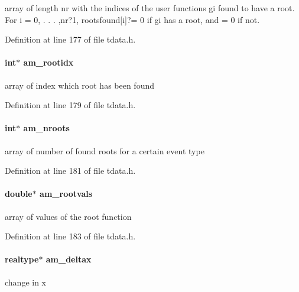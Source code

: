 array of length nr with the indices of the user functions gi found to have a root. For i = 0, . . . ,nr?1, rootsfound\mbox{[}i\mbox{]}?= 0 if gi has a root, and = 0 if not. 

Definition at line 177 of file tdata.\+h.

\hypertarget{struct_temp_data_a360ea220e712750c92bd3fc8b56230e2}{}
\paragraph[{am\+\_\+rootidx}]{\setlength{\rightskip}{0pt plus 5cm}int$\ast$ am\+\_\+rootidx}\label{struct_temp_data_a360ea220e712750c92bd3fc8b56230e2}
array of index which root has been found 

Definition at line 179 of file tdata.\+h.

\hypertarget{struct_temp_data_af329293bdb28f52dcaeb04355dc5c69e}{}
\paragraph[{am\+\_\+nroots}]{\setlength{\rightskip}{0pt plus 5cm}int$\ast$ am\+\_\+nroots}\label{struct_temp_data_af329293bdb28f52dcaeb04355dc5c69e}
array of number of found roots for a certain event type 

Definition at line 181 of file tdata.\+h.

\hypertarget{struct_temp_data_a9cf09c47af8f82be3bba711720009efe}{}
\paragraph[{am\+\_\+rootvals}]{\setlength{\rightskip}{0pt plus 5cm}double$\ast$ am\+\_\+rootvals}\label{struct_temp_data_a9cf09c47af8f82be3bba711720009efe}
array of values of the root function 

Definition at line 183 of file tdata.\+h.

\hypertarget{struct_temp_data_ab432281618cfe0f7dd7db1d8eb5ec227}{}
\paragraph[{am\+\_\+deltax}]{\setlength{\rightskip}{0pt plus 5cm}realtype$\ast$ am\+\_\+deltax}\label{struct_temp_data_ab432281618cfe0f7dd7db1d8eb5ec227}
change in x 

